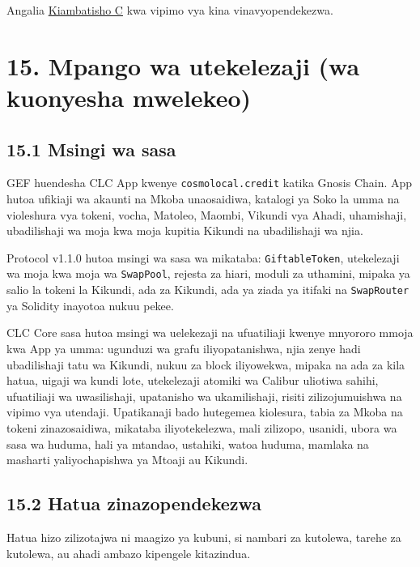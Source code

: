 \documentclass[11pt]{article}
\begin{document}
Angalia \href{https://docs.cosmolocal.credit/sw/white-paper/appendix-c-kpi-definitions}{Kiambatisho C} kwa vipimo vya kina vinavyopendekezwa.


\section*{15. Mpango wa utekelezaji (wa kuonyesha mwelekeo)}

\subsection*{15.1 Msingi wa sasa}

GEF huendesha CLC App kwenye \texttt{cosmolocal.credit} katika Gnosis Chain. App hutoa ufikiaji wa akaunti na Mkoba unaosaidiwa, katalogi ya Soko la umma na violeshura vya tokeni, vocha, Matoleo, Maombi, Vikundi vya Ahadi, uhamishaji, ubadilishaji wa moja kwa moja kupitia Kikundi na ubadilishaji wa njia.

Protocol v1.1.0 hutoa msingi wa sasa wa mikataba: \texttt{GiftableToken}, utekelezaji wa moja kwa moja wa \texttt{SwapPool}, rejesta za hiari, moduli za uthamini, mipaka ya salio la tokeni la Kikundi, ada za Kikundi, ada ya ziada ya itifaki na \texttt{SwapRouter} ya Solidity inayotoa nukuu pekee.

CLC Core sasa hutoa msingi wa uelekezaji na ufuatiliaji kwenye mnyororo mmoja kwa App ya umma: ugunduzi wa grafu iliyopatanishwa, njia zenye hadi ubadilishaji tatu wa Kikundi, nukuu za block iliyowekwa, mipaka na ada za kila hatua, uigaji wa kundi lote, utekelezaji atomiki wa Calibur uliotiwa sahihi, ufuatiliaji wa uwasilishaji, upatanisho wa ukamilishaji, risiti zilizojumuishwa na vipimo vya utendaji. Upatikanaji bado hutegemea kiolesura, tabia za Mkoba na tokeni zinazosaidiwa, mikataba iliyotekelezwa, mali zilizopo, usanidi, ubora wa sasa wa huduma, hali ya mtandao, ustahiki, watoa huduma, mamlaka na masharti yaliyochapishwa ya Mtoaji au Kikundi.

\subsection*{15.2 Hatua zinazopendekezwa}

Hatua hizo zilizotajwa ni maagizo ya kubuni, si nambari za kutolewa, tarehe za kutolewa, au ahadi ambazo kipengele kitazindua.
\end{document}
